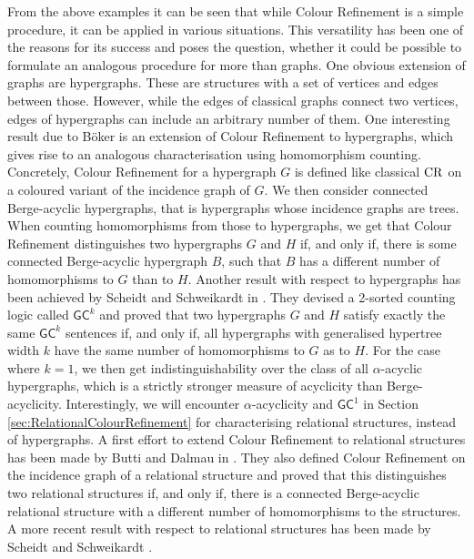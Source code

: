 From the above examples it can be seen that while Colour Refinement is a simple procedure, it can be applied in various situations.
This versatility has been one of the reasons for its success and poses the question, whether it could be possible to formulate an analogous procedure for more than graphs.
One obvious extension of graphs are hypergraphs.
These are structures with a set of vertices and edges between those.
However, while the edges of classical graphs connect two vertices, edges of hypergraphs can include an arbitrary number of them.
One interesting result due to Böker \cite{boker2019ColorRefinement} is an extension of Colour Refinement to hypergraphs, which gives rise to an analogous characterisation using homomorphism counting.
Concretely, Colour Refinement for a hypergraph $G$ is defined like classical $\operatorname{CR}$ on a coloured variant of the incidence graph of $G$.
We then consider connected Berge-acyclic hypergraphs, that is hypergraphs whose incidence graphs are trees. 
When counting homomorphisms from those to hypergraphs, we get that Colour Refinement distinguishes two hypergraphs $G$ and $H$ if, and only if, there is some connected Berge-acyclic hypergraph $B$, such that $B$ has a different number of homomorphisms to $G$ than to $H$.
Another result with respect to hypergraphs has been achieved by Scheidt and Schweikardt in \cite{scheidt2023CountingHomomorphisms}.
They devised a 2-sorted counting logic called $\mathsf{GC}^k$ and proved that two hypergraphs $G$ and $H$ satisfy exactly the same $\mathsf{GC}^k$ sentences if, and only if, all hypergraphs with generalised hypertree width $k$ have the same number of homomorphisms to $G$ as to $H$.
For the case where $k=1$, we then get indistinguishability over the class of all $\alpha$-acyclic hypergraphs, which is a strictly stronger measure of acyclicity than Berge-acyclicity.
Interestingly, we will encounter $\alpha$-acyclicity and $\mathsf{GC}^1$ in Section \ref{sec:RelationalColourRefinement} for characterising relational structures, instead of hypergraphs.
A first effort to extend Colour Refinement to relational structures has been made by Butti and Dalmau in \cite{butti2021FractionalHomomorphism}.
They also defined Colour Refinement on the incidence graph of a relational structure and proved that this distinguishes two relational structures if, and only if, there is a connected Berge-acyclic relational structure with a different number of homomorphisms to the structures.
A more recent result with respect to relational structures has been made by Scheidt and Schweikardt \cite{scheidt2025ColorRefinement}.
